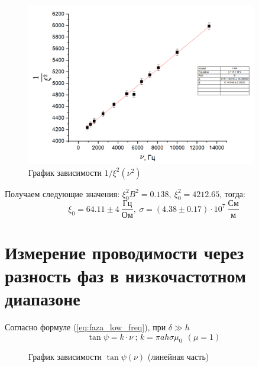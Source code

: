 \documentclass[a4paper, 12pt]{article}
\begin{document}
\begin{figure}[h!]
	\centering
	\includegraphics[width=0.9\textwidth, height = 0.45\textheight]{xi(nu).png}
	\caption{График зависимости $1/\xi^2(\nu^2)$}\label{fig:xi_nu_low_freq_linearized}
\end{figure}

Получаем следующие значения: $\xi_0^2B^2 = 0.138, \ \xi_0^2 = 4212.65$, тогда:
\[\xi_0 = 64.11 \pm 4 \ \frac{\text{Гц}}{\text{Ом}}, \ \sigma = (4.38 \pm 0.17) \cdot 10^7 \ \frac{\text{См}}{\text{м}}  \]

\section{Измерение проводимости через разность фаз в низкочастотном диапазоне}
Согласно формуле (\ref{eq:faza_low_freq}), при $\delta \gg h$
\begin{equation*}
    \tan \psi = k \cdot \nu \ \text{; } k = \pi a h \sigma \mu_0 \ \ (\mu = 1)
\end{equation*}
	\begin{figure}[h]
		\caption{График зависимости $\tan \psi (\nu)$ (линейная часть)}\label{fig:tg_psi_nu_line}
		\newpage
	\end{figure}
	
\end{document}
